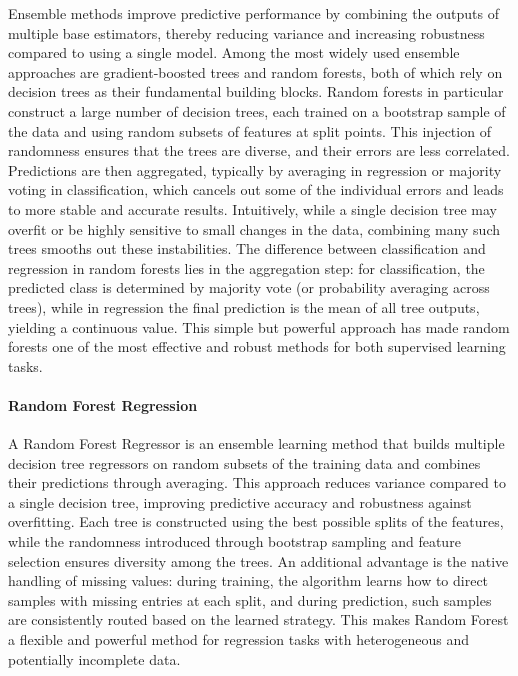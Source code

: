 Ensemble methods improve predictive performance by combining the outputs of multiple base estimators, thereby reducing variance and increasing robustness compared to using a single model. Among the most widely used ensemble approaches are gradient-boosted trees and random forests, both of which rely on decision trees as their fundamental building blocks. Random forests in particular construct a large number of decision trees, each trained on a bootstrap sample of the data and using random subsets of features at split points. This injection of randomness ensures that the trees are diverse, and their errors are less correlated. Predictions are then aggregated, typically by averaging in regression or majority voting in classification, which cancels out some of the individual errors and leads to more stable and accurate results. Intuitively, while a single decision tree may overfit or be highly sensitive to small changes in the data, combining many such trees smooths out these instabilities. The difference between classification and regression in random forests lies in the aggregation step: for classification, the predicted class is determined by majority vote (or probability averaging across trees), while in regression the final prediction is the mean of all tree outputs, yielding a continuous value. This simple but powerful approach has made random forests one of the most effective and robust methods for both supervised learning tasks.

\paragraph{Random Forest Regression}
\label{sec:background_ml_rfr}
A Random Forest Regressor is an ensemble learning method that builds multiple decision tree regressors on random subsets of the training data and combines their predictions through averaging. This approach reduces variance compared to a single decision tree, improving predictive accuracy and robustness against overfitting. Each tree is constructed using the best possible splits of the features, while the randomness introduced through bootstrap sampling and feature selection ensures diversity among the trees. An additional advantage is the native handling of missing values: during training, the algorithm learns how to direct samples with missing entries at each split, and during prediction, such samples are consistently routed based on the learned strategy. This makes Random Forest a flexible and powerful method for regression tasks with heterogeneous and potentially incomplete data.

